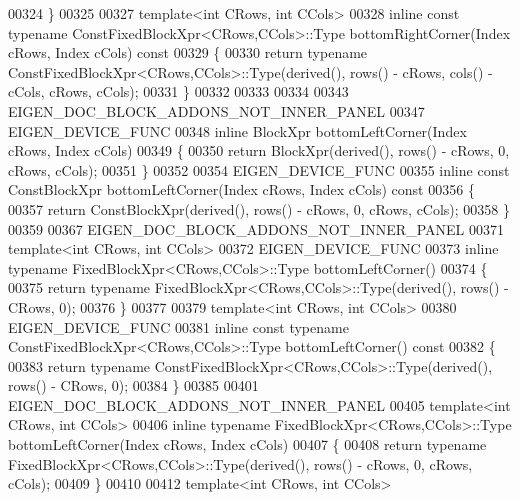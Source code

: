 \begin{DoxyCode}
00324 \}
00325 
00327 \textcolor{keyword}{template}<\textcolor{keywordtype}{int} CRows, \textcolor{keywordtype}{int} CCols>
00328 \textcolor{keyword}{inline} \textcolor{keyword}{const} \textcolor{keyword}{typename} ConstFixedBlockXpr<CRows,CCols>::Type bottomRightCorner(Index cRows, Index cCols)\textcolor{keyword}{
       const}
00329 \textcolor{keyword}{}\{
00330   \textcolor{keywordflow}{return} \textcolor{keyword}{typename} ConstFixedBlockXpr<CRows,CCols>::Type(derived(), rows() - cRows, cols() - cCols, cRows, 
      cCols);
00331 \}
00332 
00333 
00334 
00343 EIGEN\_DOC\_BLOCK\_ADDONS\_NOT\_INNER\_PANEL
00347 EIGEN\_DEVICE\_FUNC
00348 \textcolor{keyword}{inline} BlockXpr bottomLeftCorner(Index cRows, Index cCols)
00349 \{
00350   \textcolor{keywordflow}{return} BlockXpr(derived(), rows() - cRows, 0, cRows, cCols);
00351 \}
00352 
00354 EIGEN\_DEVICE\_FUNC
00355 \textcolor{keyword}{inline} \textcolor{keyword}{const} ConstBlockXpr bottomLeftCorner(Index cRows, Index cCols)\textcolor{keyword}{ const}
00356 \textcolor{keyword}{}\{
00357   \textcolor{keywordflow}{return} ConstBlockXpr(derived(), rows() - cRows, 0, cRows, cCols);
00358 \}
00359 
00367 EIGEN\_DOC\_BLOCK\_ADDONS\_NOT\_INNER\_PANEL
00371 \textcolor{keyword}{template}<\textcolor{keywordtype}{int} CRows, \textcolor{keywordtype}{int} CCols>
00372 EIGEN\_DEVICE\_FUNC
00373 \textcolor{keyword}{inline} \textcolor{keyword}{typename} FixedBlockXpr<CRows,CCols>::Type bottomLeftCorner()
00374 \{
00375   \textcolor{keywordflow}{return} \textcolor{keyword}{typename} FixedBlockXpr<CRows,CCols>::Type(derived(), rows() - CRows, 0);
00376 \}
00377 
00379 \textcolor{keyword}{template}<\textcolor{keywordtype}{int} CRows, \textcolor{keywordtype}{int} CCols>
00380 EIGEN\_DEVICE\_FUNC
00381 \textcolor{keyword}{inline} \textcolor{keyword}{const} \textcolor{keyword}{typename} ConstFixedBlockXpr<CRows,CCols>::Type bottomLeftCorner()\textcolor{keyword}{ const}
00382 \textcolor{keyword}{}\{
00383   \textcolor{keywordflow}{return} \textcolor{keyword}{typename} ConstFixedBlockXpr<CRows,CCols>::Type(derived(), rows() - CRows, 0);
00384 \}
00385 
00401 EIGEN\_DOC\_BLOCK\_ADDONS\_NOT\_INNER\_PANEL
00405 \textcolor{keyword}{template}<\textcolor{keywordtype}{int} CRows, \textcolor{keywordtype}{int} CCols>
00406 \textcolor{keyword}{inline} \textcolor{keyword}{typename} FixedBlockXpr<CRows,CCols>::Type bottomLeftCorner(Index cRows, Index cCols)
00407 \{
00408   \textcolor{keywordflow}{return} \textcolor{keyword}{typename} FixedBlockXpr<CRows,CCols>::Type(derived(), rows() - cRows, 0, cRows, cCols);
00409 \}
00410 
00412 \textcolor{keyword}{template}<\textcolor{keywordtype}{int} CRows, \textcolor{keywordtype}{int} CCols>

\end{DoxyCode}
